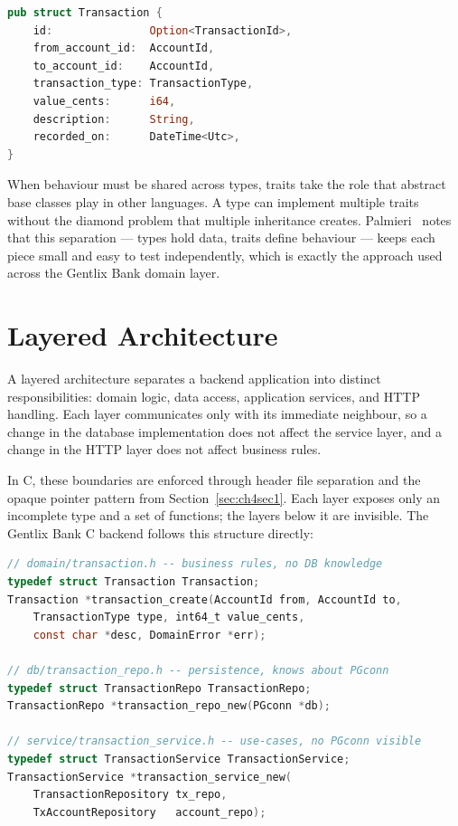 \begin{lstlisting}[language=Rust, caption={transaction.rs (domain) ---
Composition over inheritance. Each field is a validated value type; the
compiler ensures that a \texttt{Transaction} can only exist with all
fields present and valid.}]
pub struct Transaction {
    id:               Option<TransactionId>,
    from_account_id:  AccountId,
    to_account_id:    AccountId,
    transaction_type: TransactionType,
    value_cents:      i64,
    description:      String,
    recorded_on:      DateTime<Utc>,
}
\end{lstlisting}

When behaviour must be shared across types, traits take the role that
abstract base classes play in other languages. A type can implement
multiple traits without the diamond problem that multiple inheritance
creates. Palmieri~\cite{Palmieri2022} notes that this separation --- types
hold data, traits define behaviour --- keeps each piece small and easy to
test independently, which is exactly the approach used across the Gentlix
Bank domain layer.

\section{Layered Architecture}
\label{sec:ch4sec5}

A layered architecture separates a backend application into distinct
responsibilities: domain logic, data access, application services, and HTTP
handling. Each layer communicates only with its immediate neighbour, so a
change in the database implementation does not affect the service layer, and
a change in the HTTP layer does not affect business rules.

\newpage
In C, these boundaries are enforced through header file separation and the
opaque pointer pattern from Section~\ref{sec:ch4sec1}. Each layer exposes
only an incomplete type and a set of functions; the layers below it are
invisible. The Gentlix Bank C backend follows this structure directly:

\begin{lstlisting}[language=C, caption={Header boundaries in the C backend.
Each layer sees only the interface of the layer below; concrete structs and
database handles never cross layer boundaries.}]
// domain/transaction.h -- business rules, no DB knowledge
typedef struct Transaction Transaction;
Transaction *transaction_create(AccountId from, AccountId to,
    TransactionType type, int64_t value_cents,
    const char *desc, DomainError *err);

// db/transaction_repo.h -- persistence, knows about PGconn
typedef struct TransactionRepo TransactionRepo;
TransactionRepo *transaction_repo_new(PGconn *db);

// service/transaction_service.h -- use-cases, no PGconn visible
typedef struct TransactionService TransactionService;
TransactionService *transaction_service_new(
    TransactionRepository tx_repo,
    TxAccountRepository   account_repo);
\end{lstlisting}

